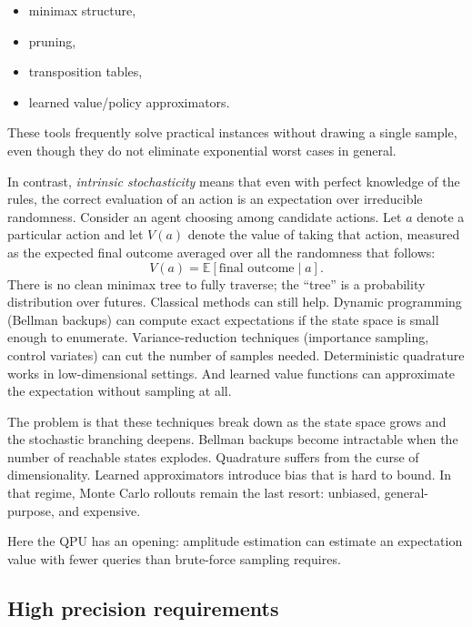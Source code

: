 \begin{itemize}
  \item minimax structure,
  \item pruning,
  \item transposition tables,
  \item learned value/policy approximators.
\end{itemize}

These tools frequently solve practical instances without drawing a single sample, even though they do not eliminate exponential worst cases in general.

In contrast, \emph{intrinsic stochasticity} means that even with perfect knowledge of the rules, the correct evaluation of an action is an expectation over irreducible randomness.
Consider an agent choosing among candidate actions.
Let $a$ denote a particular action and let $V(a)$ denote the value of taking that action, measured as the expected final outcome averaged over all the randomness that follows:
\begin{equation}
V(a) = \mathbb{E}\!\left[\text{final outcome} \mid a\right].
\end{equation}
There is no clean minimax tree to fully traverse; the ``tree'' is a probability distribution over futures.
Classical methods can still help.
Dynamic programming (Bellman backups) can compute exact expectations if the state space is small enough to enumerate.
Variance-reduction techniques (importance sampling, control variates) can cut the number of samples needed.
Deterministic quadrature works in low-dimensional settings.
And learned value functions can approximate the expectation without sampling at all.

The problem is that these techniques break down as the state space grows and the stochastic branching deepens.
Bellman backups become intractable when the number of reachable states explodes.
Quadrature suffers from the curse of dimensionality.
Learned approximators introduce bias that is hard to bound.
In that regime, Monte Carlo rollouts remain the last resort: unbiased, general-purpose, and expensive.

Here the QPU has an opening: amplitude estimation can estimate an expectation value with fewer queries than brute-force sampling requires.

\subsection{High precision requirements}

